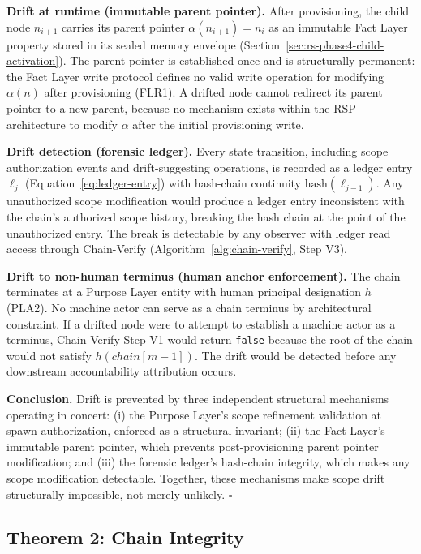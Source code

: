 \medskip
\noindent\textbf{Drift at runtime (immutable parent pointer).} After provisioning, the child node $n_{i+1}$ carries its parent pointer $\alpha(n_{i+1}) = n_i$ as an immutable Fact Layer property stored in its sealed memory envelope (Section~\ref{sec:rs-phase4-child-activation}). The parent pointer is established once and is structurally permanent: the Fact Layer write protocol defines no valid write operation for modifying $\alpha(n)$ after provisioning (FLR1). A drifted node cannot redirect its parent pointer to a new parent, because no mechanism exists within the RSP architecture to modify $\alpha$ after the initial provisioning write.

\medskip
\noindent\textbf{Drift detection (forensic ledger).} Every state transition, including scope authorization events and drift-suggesting operations, is recorded as a ledger entry $\ell_j$ (Equation~\ref{eq:ledger-entry}) with hash-chain continuity $\text{hash}(\ell_{j-1})$. Any unauthorized scope modification would produce a ledger entry inconsistent with the chain's authorized scope history, breaking the hash chain at the point of the unauthorized entry. The break is detectable by any observer with ledger read access through Chain-Verify (Algorithm~\ref{alg:chain-verify}, Step V3).

\medskip
\noindent\textbf{Drift to non-human terminus (human anchor enforcement).} The chain terminates at a Purpose Layer entity with human principal designation $h$ (PLA2). No machine actor can serve as a chain terminus by architectural constraint. If a drifted node were to attempt to establish a machine actor as a terminus, Chain-Verify Step V1 would return \texttt{false} because the root of the chain would not satisfy $h(chain[m-1])$. The drift would be detected before any downstream accountability attribution occurs.

\medskip
\noindent\textbf{Conclusion.} Drift is prevented by three independent structural mechanisms operating in concert: (i) the Purpose Layer's scope refinement validation at spawn authorization, enforced as a structural invariant; (ii) the Fact Layer's immutable parent pointer, which prevents post-provisioning parent pointer modification; and (iii) the forensic ledger's hash-chain integrity, which makes any scope modification detectable. Together, these mechanisms make scope drift structurally impossible, not merely unlikely. $\square$

\subsection{Theorem 2: Chain Integrity}
\label{sec:rs-thm-integrity}


